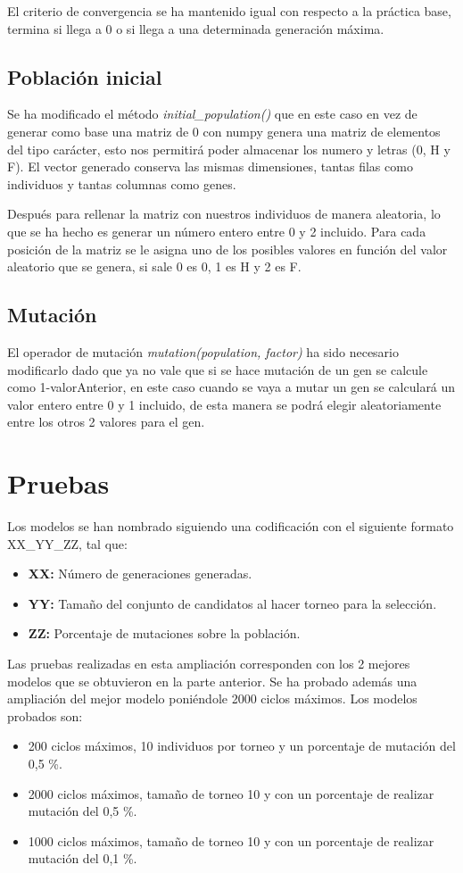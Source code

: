 \documentclass[12pt, spanish, pdftex]{UC3M_document}
\begin{document}
El criterio de convergencia se ha mantenido igual con respecto a la práctica base, termina si llega a 0 o si llega a una determinada generación máxima.

\subsection{Población inicial}
Se ha modificado el método \textit{initial\_population()} que en este caso en vez de generar como base una matriz de 0 con numpy genera una matriz de elementos del tipo carácter, esto nos permitirá poder almacenar los numero y letras (0, H y F). El vector generado conserva las mismas dimensiones, tantas filas como individuos y tantas columnas como genes.

Después para rellenar la matriz con nuestros individuos de manera aleatoria, lo que se ha hecho es generar un número entero entre 0 y 2 incluido. Para cada posición de la matriz se le asigna uno de los posibles valores en función del valor aleatorio que se genera, si sale 0 es 0, 1 es H y 2 es F.

\subsection{Mutación}
El operador de mutación \textit{mutation(population, factor)} ha sido necesario modificarlo dado que ya no vale que si se hace mutación de un gen se calcule como 1-valorAnterior, en este caso cuando se vaya a mutar un gen se calculará un valor entero entre 0 y 1 incluido, de esta manera se podrá elegir aleatoriamente entre los otros 2 valores para el gen.
\pagebreak

\section{Pruebas}
Los modelos se han nombrado siguiendo una codificación con el siguiente formato XX\_YY\_ZZ, tal que:
\begin{itemize}
	\item \textbf{XX:} Número de generaciones generadas.
	\item \textbf{YY:} Tamaño del conjunto de candidatos al hacer torneo para la selección.
	\item \textbf{ZZ:} Porcentaje de mutaciones sobre la población.
\end{itemize}

Las pruebas realizadas en esta ampliación corresponden con los 2 mejores modelos que se obtuvieron en la parte anterior. Se ha probado además una ampliación del mejor modelo poniéndole 2000 ciclos máximos. Los modelos probados son:
\begin{itemize}
	\item 200 ciclos máximos, 10 individuos por torneo y un porcentaje de mutación del 0,5 \%.
	\item 2000 ciclos máximos, tamaño de torneo 10 y con un porcentaje de realizar mutación del 0,5 \%.
	\item 1000 ciclos máximos, tamaño de torneo 10 y con un porcentaje de realizar mutación del 0,1 \%.
\end{itemize}
\end{document}
